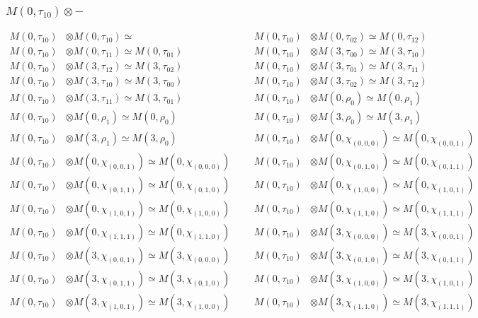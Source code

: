 \subsubsection{$ M(0,\tau_{10})\otimes -$}
\begin{align*}
M(0,\tau_{10}) &\otimes M(0,\tau_{10}) \simeq  &&& M(0,\tau_{10}) &\otimes M(0,\tau_{02}) \simeq M(0,\tau_{12})\\
M(0,\tau_{10}) &\otimes M(0,\tau_{11}) \simeq M(0,\tau_{01}) &&& M(0,\tau_{10}) &\otimes M(3,\tau_{00}) \simeq M(3,\tau_{10})\\
M(0,\tau_{10}) &\otimes M(3,\tau_{12}) \simeq M(3,\tau_{02}) &&& M(0,\tau_{10}) &\otimes M(3,\tau_{01}) \simeq M(3,\tau_{11})\\
M(0,\tau_{10}) &\otimes M(3,\tau_{10}) \simeq M(3,\tau_{00}) &&& M(0,\tau_{10}) &\otimes M(3,\tau_{02}) \simeq M(3,\tau_{12})\\
M(0,\tau_{10}) &\otimes M(3,\tau_{11}) \simeq M(3,\tau_{01}) &&& M(0,\tau_{10}) &\otimes M(0,\rho_{0}) \simeq M(0,\rho_{1})\\
M(0,\tau_{10}) &\otimes M(0,\rho_{1}) \simeq M(0,\rho_{0}) &&& M(0,\tau_{10}) &\otimes M(3,\rho_{0}) \simeq M(3,\rho_{1})\\
M(0,\tau_{10}) &\otimes M(3,\rho_{1}) \simeq M(3,\rho_{0}) &&& M(0,\tau_{10}) &\otimes M(0,\chi_{(0,0,0)}) \simeq M(0,\chi_{(0,0,1)})\\
M(0,\tau_{10}) &\otimes M(0,\chi_{(0,0,1)}) \simeq M(0,\chi_{(0,0,0)}) &&& M(0,\tau_{10}) &\otimes M(0,\chi_{(0,1,0)}) \simeq M(0,\chi_{(0,1,1)})\\
M(0,\tau_{10}) &\otimes M(0,\chi_{(0,1,1)}) \simeq M(0,\chi_{(0,1,0)}) &&& M(0,\tau_{10}) &\otimes M(0,\chi_{(1,0,0)}) \simeq M(0,\chi_{(1,0,1)})\\
M(0,\tau_{10}) &\otimes M(0,\chi_{(1,0,1)}) \simeq M(0,\chi_{(1,0,0)}) &&& M(0,\tau_{10}) &\otimes M(0,\chi_{(1,1,0)}) \simeq M(0,\chi_{(1,1,1)})\\
M(0,\tau_{10}) &\otimes M(0,\chi_{(1,1,1)}) \simeq M(0,\chi_{(1,1,0)}) &&& M(0,\tau_{10}) &\otimes M(3,\chi_{(0,0,0)}) \simeq M(3,\chi_{(0,0,1)})\\
M(0,\tau_{10}) &\otimes M(3,\chi_{(0,0,1)}) \simeq M(3,\chi_{(0,0,0)}) &&& M(0,\tau_{10}) &\otimes M(3,\chi_{(0,1,0)}) \simeq M(3,\chi_{(0,1,1)})\\
M(0,\tau_{10}) &\otimes M(3,\chi_{(0,1,1)}) \simeq M(3,\chi_{(0,1,0)}) &&& M(0,\tau_{10}) &\otimes M(3,\chi_{(1,0,0)}) \simeq M(3,\chi_{(1,0,1)})\\
M(0,\tau_{10}) &\otimes M(3,\chi_{(1,0,1)}) \simeq M(3,\chi_{(1,0,0)}) &&& M(0,\tau_{10}) &\otimes M(3,\chi_{(1,1,0)}) \simeq M(3,\chi_{(1,1,1)})\\

\end{align*}
